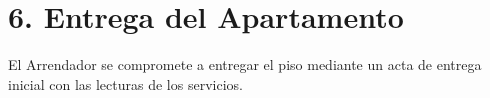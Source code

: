 \section*{6. Entrega del Apartamento}
El Arrendador se compromete a entregar el piso mediante un acta de entrega inicial con las lecturas de los servicios.
